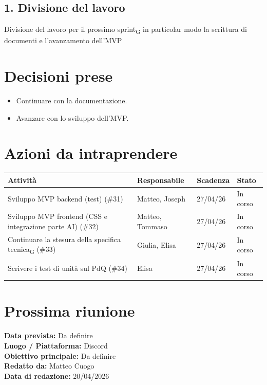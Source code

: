 \documentclass[a4paper,12pt]{article}
\newcommand{\gls}[1]{#1\textsubscript{G}}
\begin{document}
\subsection*{1. Divisione del lavoro}
Divisione del lavoro per il prossimo \gls{sprint} in particolar modo la scrittura di documenti e l'avanzamento dell'MVP

\section*{Decisioni prese}
\begin{itemize}
    \item Continuare con la documentazione.
    \item Avanzare con lo sviluppo dell'MVP.
\end{itemize}

\section*{Azioni da intraprendere}
\begin{longtable}{|p{}|p{}|p{}|p{}|}
\hline
\textbf{Attività} & \textbf{Responsabile} & \textbf{Scadenza} & \textbf{Stato} \\ \hline
Sviluppo MVP backend (test) (\#31) & Matteo, Joseph & 27/04/26 & In corso \\ \hline
Sviluppo MVP frontend (CSS e integrazione parte AI) (\#32) & Matteo, Tommaso & 27/04/26 & In corso \\ \hline
Continuare la stesura della \gls{specifica tecnica} (\#33) & Giulia, Elisa & 27/04/26 & In corso \\ \hline
Scrivere i test di unità sul PdQ (\#34) & Elisa & 27/04/26 & In corso \\ \hline


\end{longtable}


\section*{Prossima riunione}
\textbf{Data prevista:} Da definire\\
\textbf{Luogo / Piattaforma:} Discord \\
\textbf{Obiettivo principale:} Da definire\\



\textbf{Redatto da:} Matteo Cuogo \\
\textbf{Data di redazione:} 20/04/2026
\end{document}
